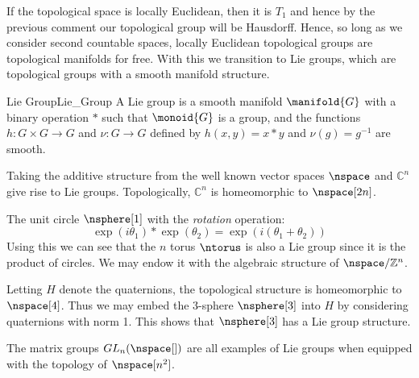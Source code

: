 \documentclass{book}                                                            %
\begin{document}
            If the topological space is locally Euclidean, then it is $T_{1}$
            and hence by the previous comment our topological group will be
            Hausdorff. Hence, so long as we consider second countable spaces,
            locally Euclidean topological groups are topological manifolds for
            free. With this we transition to Lie groups, which are topological
            groups with a smooth manifold structure.
            \begin{fdefinition}{Lie Group}{Lie_Group}
                A Lie group is a smooth manifold $\manifold{G}$ with a binary
                operation $*$ such that $\monoid{G}$ is a group, and the
                functions $h:G\times{G}\rightarrow{G}$ and $\nu:G\rightarrow{G}$
                defined by $h(x,y)=x*y$ and $\nu(g)=g^{\minus{1}}$ are smooth.
            \end{fdefinition}
            \begin{example}
                Taking the additive structure from the well known vector spaces
                $\nspace$ and $\mathbb{C}^{n}$ give rise to Lie groups.
                Topologically, $\mathbb{C}^{n}$ is homeomorphic to
                $\nspace[2n]$.
            \end{example}
            \begin{example}
                The unit circle $\nsphere[1]$ with the \textit{rotation}
                operation:
                \begin{equation}
                    \exp(i\theta_{1})*\exp(\theta_{2})
                        =\exp(i(\theta_{1}+\theta_{2}))
                \end{equation}
                Using this we can see that the $n$ torus $\ntorus$ is also a
                Lie group since it is the product of circles. We may endow it
                with the algebraic structure of $\nspace/\mathbb{Z}^{n}$.
            \end{example}
            \begin{example}
                Letting $H$ denote the quaternions, the topological structure is
                homeomorphic to $\nspace[4]$. Thus we may embed the 3-sphere
                $\nsphere[3]$ into $H$ by considering quaternions with norm 1.
                This shows that $\nsphere[3]$ has a Lie group structure.
            \end{example}
            \begin{example}
                The matrix groups $GL_{n}(\nspace[])$ are all examples of Lie
                groups when equipped with the topology of $\nspace[n^{2}]$.
            \end{example}
\end{document}
